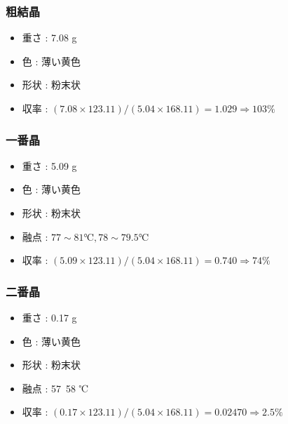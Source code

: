 \documentclass[a4paper,papersize,dvipdfmx]{jsarticle}
\begin{document}
\subsubsection*{粗結晶}
\begin{itemize}
\item 重さ : 7.08 g
\item 色 : 薄い黄色
\item 形状 : 粉末状
\item 収率 : $(7.08 \times 123.11) / (5.04 \times 168.11) = 1.029  \Longrightarrow 103 \%$

\end{itemize}
\subsubsection*{一番晶}
\begin{itemize}
\item 重さ : 5.09 g
\item 色 : 薄い黄色
\item 形状 : 粉末状
\item 融点 :  $77\sim81 ℃,  78\sim79.5 ℃$
\item 収率 : $(5.09 \times 123.11) / (5.04 \times 168.11) = 0.740  \Longrightarrow 74 \%$

\end{itemize}
\subsubsection*{二番晶}
\begin{itemize}
\item 重さ : 0.17 g
\item 色 : 薄い黄色
\item 形状 : 粉末状
\item 融点 : 57~58 ℃
\item 収率 : $(0.17 \times 123.11) / (5.04 \times 168.11) = 0.02470  \Longrightarrow 2.5 \%$

\end{itemize}
\end{document}
